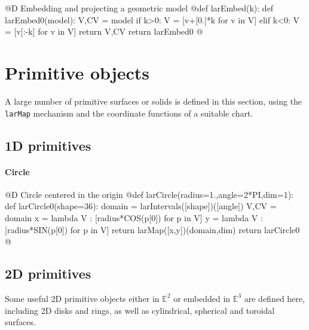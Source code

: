 \documentclass[11pt,oneside]{article}	%
\def\E{\mathbb{E}}
\begin{document}
@D Embedding and projecting a geometric model
@{def larEmbed(k):
	def larEmbed0(model):
		V,CV = model
		if k>0:
			V = [v+[0.]*k for v in V] 
		elif k<0:
			V = [v[:-k] for v in V] 
		return V,CV
	return larEmbed0
@}


\section{Primitive objects}
\label{sec:generators}

A large number of primitive surfaces or solids is defined in this section, using the \texttt{larMap} mechanism and the coordinate functions of a suitable chart.

\subsection{1D primitives}

\paragraph{Circle}
@D Circle centered in the origin
@{def larCircle(radius=1.,angle=2*PI,dim=1):
	def larCircle0(shape=36):
		domain = larIntervals([shape])([angle])
		V,CV = domain
		x = lambda V : [radius*COS(p[0]) for p in V]
		y = lambda V : [radius*SIN(p[0]) for p in V]
		return larMap([x,y])(domain,dim)
	return larCircle0
@}
\subsection{2D primitives}
Some useful 2D primitive objects either in $\E^2$ or embedded in $\E^3$ are defined here, including 2D disks and rings, as well as cylindrical, spherical and toroidal surfaces.
\end{document}
